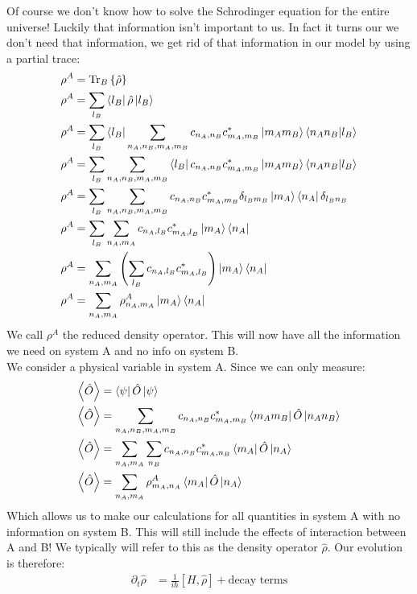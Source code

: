 Of course we don't know how to solve the Schrodinger equation for the entire universe! Luckily that information isn't important to us. In fact it turns our we don't need that information, we get rid of that information in our model by using a partial trace:
\begin{align*}
	\rho^A &= \Tr_B\left\{\hat{\rho}\right\} \\
	\rho^A &= \sum_{l_B} \bra{l_B}\hat{\rho}\ket{l_B} \\
	\rho^A &= \sum_{l_B} \bra{l_B}\sum_{n_A,n_B,m_A,m_B} c_{n_A,n_B}c_{m_A,m_B}^* \ket{m_Am_B}\bra{n_An_B}\ket{l_B} \\
	\rho^A &= \sum_{l_B} \sum_{n_A,n_B,m_A,m_B} \bra{l_B}c_{n_A,n_B}c_{m_A,m_B}^* \ket{m_Am_B}\bra{n_An_B}\ket{l_B} \\
	\rho^A &= \sum_{l_B} \sum_{n_A,n_B,m_A,m_B} c_{n_A,n_B}c_{m_A,m_B}^* \delta_{l_Bm_B}\ket{m_A}\bra{n_A}\delta_{l_Bn_B} \\
	\rho^A &= \sum_{l_B} \sum_{n_A,m_A} c_{n_A,l_B}c_{m_A,l_B}^* \ket{m_A}\bra{n_A} \\
	\rho^A &=  \sum_{n_A,m_A} \left(\sum_{l_B}c_{n_A,l_B}c_{m_A,l_B}^*\right) \ket{m_A}\bra{n_A} \\
	\rho^A &=  \sum_{n_A,m_A} \rho^A_{n_A,m_A} \ket{m_A}\bra{n_A}
\end{align*}
We call $\rho^A$ the reduced density operator. This will now have all the information we need on system A and no info on system B. \\
We consider a physical variable in system A. Since we can only measure:
\begin{align*}
	\expval{\hat{O}} &= \bra{\psi}\hat{O}\ket{\psi} \\
	\expval{\hat{O}} &= \sum_{n_A,n_B,m_A,m_B} c_{n_A,n_B}c_{m_A,m_B}^*\bra{m_Am_B}\hat{O}\ket{n_An_B} \\
	\expval{\hat{O}} &= \sum_{n_A,m_A} \sum_{n_B}c_{n_A,n_B}c_{m_A,n_B}^*\bra{m_A}\hat{O}\ket{n_A} \\
	\expval{\hat{O}} &= \sum_{n_A,m_A} \rho^A_{m_A,n_A}\bra{m_A}\hat{O}\ket{n_A}
\end{align*}
Which allows us to make our calculations for all quantities in system A with no information on system B. This will still include the effects of interaction between A and B! We typically will refer to this as the density operator $\hat{\rho}$. Our evolution is therefore:
\begin{align*}
	\partial_t \hat{\rho} &= \frac{1}{i\hbar}[H,\hat{\rho}] + \text{decay terms}
\end{align*}
